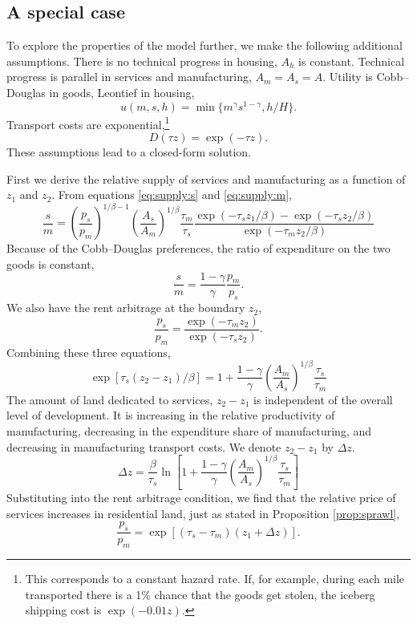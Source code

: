 \documentclass[12pt]{article}
\begin{document}
\subsection{A special case}
To explore the properties of the model further, we make the following additional assumptions.
There is no technical progress in housing, $A_h$ is constant. Technical progress is parallel in services and manufacturing, $A_m=A_s=A$. Utility is Cobb--Douglas in goods, Leontief in housing,
\[
u(m,s,h) = \min\{m^\gamma s^{1-\gamma} ,h/H\}.
\]
Transport costs are exponential,\footnote{This corresponds to a constant hazard rate. If, for example, during each mile transported there is a 1\% chance that the goods get stolen, the iceberg shipping cost is $\exp(-0.01 z)$.}
\[
D(\tau z) = \exp(-\tau z).
\]
These assumptions lead to a closed-form solution.

First we derive the relative supply of services and manufacturing as a function of $z_1$ and $z_2$. From equations \eqref{eq:supply:s} and \eqref{eq:supply:m},
\begin{equation}
 \frac{s}{m} = \left(\frac{p_s}{p_m}\right)^{1/\beta-1}
\left(\frac{A_s}{A_m}\right)^{1/\beta}
\frac{\tau_m}{\tau_s}
\frac{\exp(-\tau_s z_1/\beta)-\exp(-\tau_s z_2/\beta)}{\exp(-\tau_m z_2/\beta)}
\end{equation}
Because of the Cobb--Douglas preferences, the ratio of expenditure on the two goods is constant,
\begin{equation}
 \frac{s}{m} = \frac{1-\gamma}{\gamma}\frac{p_m}{p_s}.
\end{equation}
We also have the rent arbitrage at the boundary $z_2$,
\begin{equation}
 \frac{p_s}{p_m}  = \frac{\exp(-\tau_m z_2)}{\exp(-\tau_s z_2)}.
\end{equation}
Combining these three equations,
\begin{equation}
\exp\left[\tau_s(z_2-z_1)/\beta\right] = 1+\frac{1-\gamma}{\gamma}\left(\frac{A_m}{A_s}\right)^{1/\beta}\frac{\tau_s}{\tau_m}
\end{equation}
The amount of land dedicated to services, $z_2-z_1$ is independent of the overall level of development. It is increasing in the relative productivity of manufacturing, decreasing in the expenditure share of manufacturing, and decreasing in manufacturing transport costs. We denote $z_2-z_1$ by $\Delta z$.
\[
\Delta z = \frac{\beta}{\tau_s}\ln\left[1+\frac{1-\gamma}{\gamma}\left(\frac{A_m}{A_s}\right)^{1/\beta}\frac{\tau_s}{\tau_m}\right] 
\]
Substituting into the rent arbitrage condition, we find that the relative price of services increases in residential land, just as stated in Proposition \ref{prop:sprawl},
\begin{equation}
 \frac{p_s}{p_m} = \exp\left[(\tau_s-\tau_m)(z_1+\Delta z)\right].
\end{equation}
\end{document}
